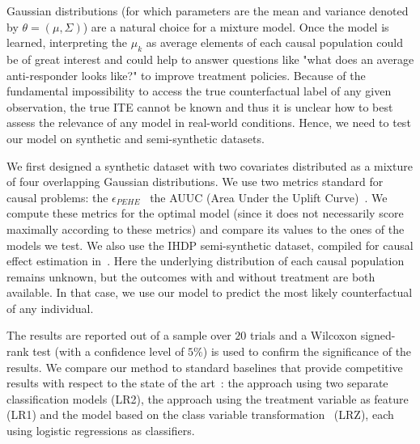 
Gaussian distributions (for which parameters are the mean and variance denoted by $\theta=(\mu, \Sigma)$) are a natural choice for a mixture model. Once the model is learned, interpreting the $\mu_k$ as average elements of each causal population could be of great interest and could help to answer questions like "what does an average anti-responder looks like?" to improve treatment policies.
Because of the fundamental impossibility to access the true counterfactual label of any given observation, the true ITE cannot be known and thus it is unclear how to best assess the relevance of any model in real-world conditions. Hence, we need to test our model on synthetic and semi-synthetic datasets. 

We first designed a synthetic dataset with two covariates distributed as a mixture of four overlapping Gaussian distributions. We use two metrics standard for causal problems: the $\epsilon_{PEHE}$~\cite{hill2011bayesian} the AUUC (Area Under the Uplift Curve)~\cite{diemert2018large}. We compute these metrics for the optimal model (since it does not necessarily score maximally according to these metrics) and compare its values to the ones of the models we test.  
We also use the IHDP semi-synthetic dataset, compiled for causal effect estimation in~\cite{hill2011bayesian}. Here the underlying distribution of each causal population remains unknown, but the outcomes with and without treatment are both available. In that case, we use our model to predict the most likely counterfactual of any individual.

The results are reported out of a sample over $20$ trials and a Wilcoxon signed-rank test (with a confidence level of $5\%$) is used to confirm the significance of the results.
We compare our method to standard baselines that provide competitive results with respect to the state of the art~\cite{alaa2018limits}: the approach using two separate classification models (LR2), the approach using the treatment variable as feature (LR1) and the model based on the class variable transformation~\cite{Jaskowski2012} (LRZ), each using logistic regressions as classifiers.


